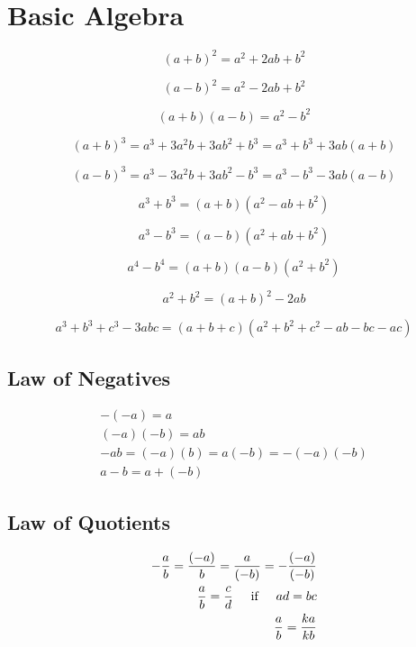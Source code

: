 \section{Basic Algebra}

\begin{equation}
\label{(a+b)2}
(a+b)^2 = a^2 + 2ab + b^2
\end{equation}

\begin{equation}
\label{(a-b)2}
(a-b)^2 = a^2 - 2ab + b^2
\end{equation}

\begin{equation}
\label{(a+b)(a-b)}
(a+b)(a-b) = a^2 - b^2
\end{equation}

\begin{equation}
\label{(a+b)3}
(a+b)^3 = a^3 + 3a^2b + 3ab^2 + b^3 = a^3 + b^3 + 3ab(a+b)
\end{equation}

\begin{equation}
\label{(a-b)3}
(a-b)^3 = a^3 - 3a^2b + 3ab^2 - b^3 = a^3 - b^3 - 3ab(a-b) 
\end{equation}

\begin{equation}
\label{a3+b3}
a^3+b^3 = (a+b)(a^2-ab+b^2) 
\end{equation}

\begin{equation}
\label{a3-b3}
a^3-b^3 = (a-b)(a^2+ab+b^2) 
\end{equation}

\begin{equation}
\label{a4-b4}
a^4-b^4 = (a+b)(a-b)(a^2+b^2) 
\end{equation}

\begin{equation}
\label{a2+b2}
a^2+b^2 = (a+b)^2 - 2ab 
\end{equation}

\begin{equation}
\label{a3+b3+c3}
a^3+b^3+c^3 - 3abc = (a+b+c)(a^2+b^2+c^2-ab-bc-ac)
\end{equation}

\subsection{Law of Negatives}
\begin{align*}
-(-a) = a \\
(-a)(-b) = ab\\
-ab = (-a)(b) = a(-b) = -(-a)(-b)\\
a - b = a + (-b)
\end{align*}

\subsection{Law of Quotients}
\begin{align*}
-\frac{a}{b} = \frac{(-a)}{b} = \frac{a}{(-b)} = -\frac{(-a)}{(-b)}\\
\frac{a}{b} = \frac{c}{d} \hspace{5mm} \text{if} \hspace{5mm} ad = bc\\
\frac{a}{b} = \frac{ka}{kb}
\end{align*}